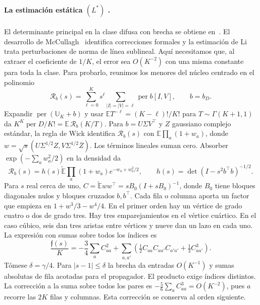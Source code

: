 \paragraph{La estimación estática $(L^*)$ .}
El determinante principal en la clase difusa con brecha se obtiene en~\cite{dw}. El desarrollo
de McCullagh~\cite{mcc} identifica correcciones formales y la estimación de Li~\cite{li} trata
perturbaciones de norma de línea sublineal. Aquí necesitamos que, al extraer el coeficiente de
$1/K$, el error sea $O(K^{-2})$ con una misma constante para toda la clase. Para probarlo,
reunimos los menores del núcleo centrado en el polinomio
\[
 \mathcal R_b(s)=\sum_{\ell=0}^K s^\ell
         \sum_{|I|=|V|=\ell}\operatorname{per} b[I,V],\qquad b=b_D .
\]
Expandir $\operatorname{per}(\mathbb U_K+b)$ y usar
$\mathbb E T^{-\ell}=(K-\ell)!/K!$ para $T\sim\Gamma(K+1,1)$ da
$K^K\operatorname{per}D/K!=\mathbb E\,\mathcal R_b(K/T)$.
Para $b=U\Sigma V^\top$ y $Z$ gaussiano complejo estándar, la regla de Wick identifica
$\mathcal R_b(s)$ con $\mathbb E\prod_a(1+w_a)$, donde
$w=\sqrt{s}(U\Sigma^{1/2}Z,V\Sigma^{1/2}\overline Z)$.
Los términos lineales suman cero. Absorber $\exp(-\sum_a w_a^2/2)$ en la densidad da
\[
 \mathcal R_b(s)=h(s)\widetilde{\mathbb E}\prod_a (1+w_a)e^{-w_a+w_a^2/2},\qquad
 h(s)=\det(I-s^2b^\top b)^{-1/2}.
\]
Para $s$ real cerca de uno, $C=\widetilde{\mathbb E}ww^\top=sB_0(I+sB_0)^{-1}$,
donde $B_0$ tiene bloques diagonales nulos y bloques cruzados $b,b^\top$.
Cada fila o columna aporta un factor que empieza en $1+w^3/3-w^4/4$. En el primer orden hay un
vértice de grado cuatro o dos de grado tres. Hay tres emparejamientos en el vértice cuártico.
En el caso cúbico, seis dan tres aristas entre vértices y nueve dan un lazo en cada uno.
La expresión con sumas sobre todos los índices es
\[
 \frac{\mathfrak f(s)}K=-\frac34\sum_a C_{aa}^2+
 \sum_{a,a'}\left(\tfrac12 C_{aa}C_{aa'}C_{a'a'}+\tfrac13 C_{aa'}^3\right).
\]
Tómese $\delta=\gamma/4$. Para $|s-1|\le\delta$ la brecha da entradas $O(K^{-1})$
y sumas absolutas de fila acotadas para el propagador. El producto exige índices distintos.
La corrección a la suma sobre todos los pares es $-\frac56\sum_a C_{aa}^3=O(K^{-2})$,
pues $a$ recorre las $2K$ filas y columnas. Esta corrección se conserva al orden siguiente.


